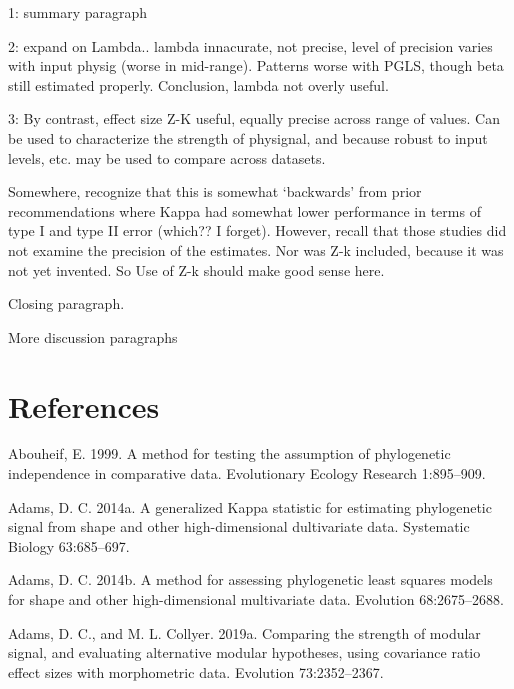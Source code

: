\documentclass[
]{article}
\begin{document}
1: summary paragraph

2: expand on Lambda.. lambda innacurate, not precise, level of precision
varies with input physig (worse in mid-range). Patterns worse with PGLS,
though beta still estimated properly. Conclusion, lambda not overly
useful.

3: By contrast, effect size Z-K useful, equally precise across range of
values. Can be used to characterize the strength of physignal, and
because robust to input levels, etc. may be used to compare across
datasets.

Somewhere, recognize that this is somewhat `backwards' from prior
recommendations where Kappa had somewhat lower performance in terms of
type I and type II error (which?? I forget). However, recall that those
studies did not examine the precision of the estimates. Nor was Z-k
included, because it was not yet invented. So Use of Z-k should make
good sense here.

Closing paragraph.

\hfill\break

More discussion paragraphs

\newpage

\hypertarget{references}{%
\section{References}\label{references}}

\setlength{\parindent}{-0.25in} \setlength{\leftskip}{0.25in}
\setlength{\parskip}{8pt} \noindent

\hypertarget{refs}{}
\leavevmode\hypertarget{ref-Abouheif1999}{}%
Abouheif, E. 1999. A method for testing the assumption of phylogenetic
independence in comparative data. Evolutionary Ecology Research
1:895--909.

\leavevmode\hypertarget{ref-Adams2014a}{}%
Adams, D. C. 2014a. A generalized Kappa statistic for estimating
phylogenetic signal from shape and other high-dimensional dultivariate
data. Systematic Biology 63:685--697.

\leavevmode\hypertarget{ref-Adams2014b}{}%
Adams, D. C. 2014b. A method for assessing phylogenetic least squares
models for shape and other high-dimensional multivariate data. Evolution
68:2675--2688.

\leavevmode\hypertarget{ref-AdamsCollyer2019b}{}%
Adams, D. C., and M. L. Collyer. 2019a. Comparing the strength of
modular signal, and evaluating alternative modular hypotheses, using
covariance ratio effect sizes with morphometric data. Evolution
73:2352--2367.
\end{document}
